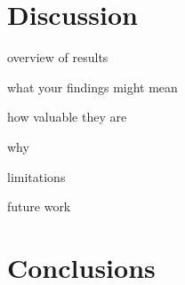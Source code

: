 \chapter{Discussion}
overview of results

what your findings might mean

how valuable they are

why

limitations

future work

\chapter{Conclusions}
